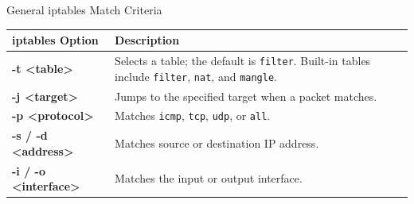 \begin{frame}{General iptables Match Criteria}
\centering\fontsize{11.5}{13.5}\selectfont
\renewcommand{\arraystretch}{1.22}
\begin{tabular}{|Y{4.0cm}|Y{8.7cm}|}\hline
{}\color{white}\bfseries iptables Option&\color{white}\bfseries Description\\\hline
\textcolor{CommandGreen}{\ttfamily\bfseries -t <table>}&Selects a table; the default is \texttt{filter}. Built-in tables include \texttt{filter}, \texttt{nat}, and \texttt{mangle}.\\\hline
\textcolor{CommandGreen}{\ttfamily\bfseries -j <target>}&Jumps to the specified target when a packet matches.\\\hline
\textcolor{CommandGreen}{\ttfamily\bfseries -p <protocol>}&Matches \texttt{icmp}, \texttt{tcp}, \texttt{udp}, or \texttt{all}.\\\hline
\textcolor{CommandGreen}{\ttfamily\bfseries -s / -d <address>}&Matches source or destination IP address.\\\hline
\textcolor{CommandGreen}{\ttfamily\bfseries -i / -o <interface>}&Matches the input or output interface.\\\hline
\end{tabular}
\end{frame}
